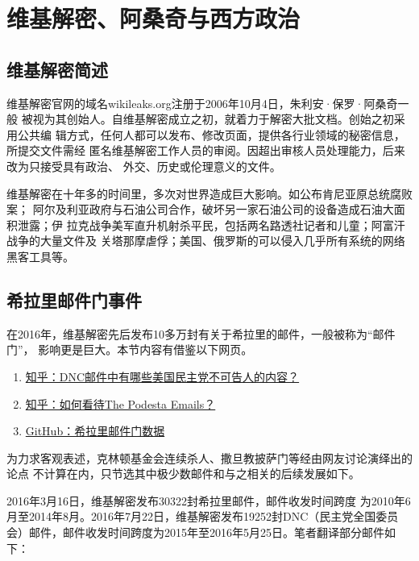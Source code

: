 \chapter{维基解密、阿桑奇与西方政治}

\section{维基解密简述}

维基解密官网的域名wikileaks.org注册于2006年10月4日，朱利安·保罗·阿桑奇一般
被视为其创始人。自维基解密成立之初，就着力于解密大批文档。创始之初采用公共编
辑方式，任何人都可以发布、修改页面，提供各行业领域的秘密信息，所提交文件需经
匿名维基解密工作人员的审阅。因超出审核人员处理能力，后来改为只接受具有政治、
外交、历史或伦理意义的文件。

维基解密在十年多的时间里，多次对世界造成巨大影响。如公布肯尼亚原总统腐败案；
阿尔及利亚政府与石油公司合作，破坏另一家石油公司的设备造成石油大面积泄露；伊
拉克战争美军直升机射杀平民，包括两名路透社记者和儿童；阿富汗战争的大量文件及
关塔那摩虐俘；美国、俄罗斯的可以侵入几乎所有系统的网络黑客工具等。

\section{希拉里邮件门事件}
\label{sec:podestamail}

在2016年，维基解密先后发布10多万封有关于希拉里的邮件，一般被称为“邮件门”，
影响更是巨大。本节内容有借鉴以下网页。
\begin{enumerate}
\item \href{https://www.zhihu.com/question/41676600}{知乎：DNC邮件中有哪些美国民主党不可告人的内容？}

\item \href{https://www.zhihu.com/question/51362588}{知乎：如何看待The Podesta Emails？}

\item \href{https://github.com/zhouningyi/us_selection_crack}{GitHub：希拉里邮件门数据}
\end{enumerate}


为力求客观表述，克林顿基金会连续杀人、撒旦教披萨门等经由网友讨论演绎出的论点
不计算在内，只节选其中极少数邮件和与之相关的后续发展如下。

2016年3月16日，维基解密发布30322封希拉里邮件，邮件收发时间跨度
为2010年6月至2014年8月。2016年7月22日，维基解密发布19252封DNC（民主党全国委员
会）邮件，邮件收发时间跨度为2015年至2016年5月25日。笔者翻译部分邮件如下：

